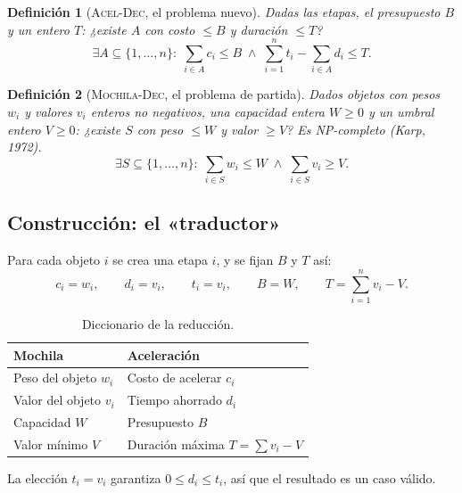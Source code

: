 \documentclass[11pt,a4paper]{article}
\theoremstyle{plano}
\newtheorem{definicion}{Definición}[section]
\begin{document}
\begin{definicion}[\textsc{Acel-Dec}, el problema nuevo]
Dadas las etapas, el presupuesto $B$ y un entero $T$: ¿existe $A$ con costo $\le B$ y duración $\le T$?
\begin{equation}
  \exists A\subseteq\{1,\dots,n\}:\; \sum_{i\in A} c_i\le B \;\wedge\; \sum_{i=1}^{n} t_i-\sum_{i\in A} d_i\le T.
\end{equation}
\end{definicion}
\begin{definicion}[\textsc{Mochila-Dec}, el problema de partida]
Dados objetos con pesos $w_i$ y valores $v_i$ enteros no negativos, una capacidad entera $W\ge 0$ y un umbral entero $V\ge 0$: ¿existe $S$ con peso $\le W$ y valor $\ge V$? Es NP-completo (Karp, 1972).
\begin{equation}
  \exists S\subseteq\{1,\dots,n\}:\; \sum_{i\in S} w_i\le W \;\wedge\; \sum_{i\in S} v_i\ge V.
\end{equation}
\end{definicion}

\subsection{Construcción: el «traductor»}

Para cada objeto $i$ se crea una etapa $i$, y se fijan $B$ y $T$ así:
\begin{equation}
  c_i=w_i,\qquad d_i=v_i,\qquad t_i=v_i,\qquad B=W,\qquad T=\sum_{i=1}^{n} v_i-V.\label{eq:trad}
\end{equation}

\begin{table}[h]
\centering\small
\renewcommand{\arraystretch}{1.1}
\begin{tabular}{@{}ll@{}}
\toprule
\bfseries Mochila & \bfseries Aceleración \\
\midrule
Peso del objeto $w_i$ & Costo de acelerar $c_i$ \\
Valor del objeto $v_i$ & Tiempo ahorrado $d_i$ \\
Capacidad $W$ & Presupuesto $B$ \\
Valor mínimo $V$ & Duración máxima $T=\sum v_i-V$ \\
\bottomrule
\end{tabular}
\caption{Diccionario de la reducción.}
\end{table}

La elección $t_i=v_i$ garantiza $0\le d_i\le t_i$, así que el resultado es un caso válido.
\end{document}
